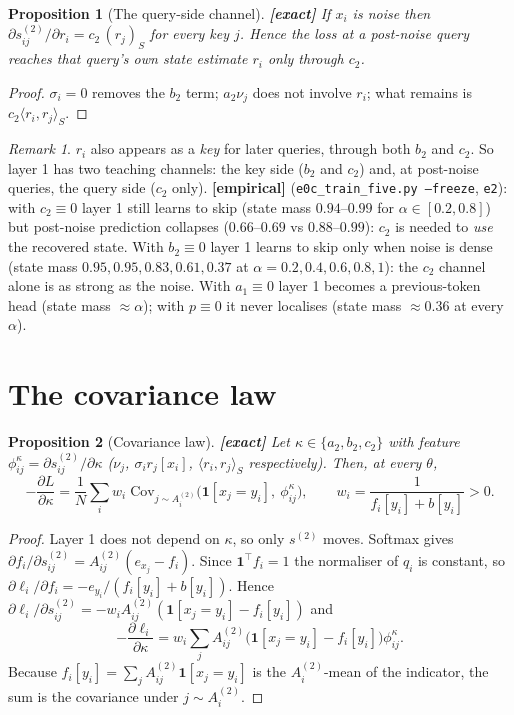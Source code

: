 \documentclass[11pt]{article}
\newtheorem{proposition}{Proposition}
\theoremstyle{definition}
\theoremstyle{remark}
\newtheorem{remark}{Remark}
\newcommand{\1}{\mathbf{1}}
\newcommand{\ip}[2]{\langle #1,#2\rangle_{S}}
\begin{document}
\begin{proposition}[The query-side channel] \textbf{[exact]}
If $x_i$ is noise then $\partial s^{(2)}_{ij}/\partial r_i = c_2\,(r_j)_S$ for every key $j$.
Hence the loss at a post-noise query reaches that query's \emph{own} state estimate $r_i$
only through $c_2$.
\end{proposition}
\begin{proof}
$\sigma_i=0$ removes the $b_2$ term; $a_2\nu_j$ does not involve $r_i$; what remains is
$c_2\ip{r_i}{r_j}$.
\end{proof}
\begin{remark}
$r_i$ also appears as a \emph{key} for later queries, through both $b_2$ and $c_2$. So layer 1
has two teaching channels: the key side ($b_2$ and $c_2$) and, at post-noise queries, the query
side ($c_2$ only). \textbf{[empirical]} (\texttt{e0c\_train\_five.py --freeze}, \texttt{e2}):
with $c_2\equiv0$ layer 1 still learns to skip (state mass $0.94$--$0.99$ for
$\alpha\in[0.2,0.8]$) but post-noise prediction collapses ($0.66$--$0.69$ vs $0.88$--$0.99$):
$c_2$ is needed to \emph{use} the recovered state. With $b_2\equiv0$ layer 1 learns to skip only
when noise is dense (state mass $0.95, 0.95, 0.83, 0.61, 0.37$ at $\alpha=0.2,0.4,0.6,0.8,1$):
the $c_2$ channel alone is as strong as the noise. With $a_1\equiv0$ layer 1 becomes a
previous-token head (state mass $\approx\alpha$); with $p\equiv0$ it never localises
(state mass $\approx0.36$ at every $\alpha$).
\end{remark}

\section{The covariance law}

\begin{proposition}[Covariance law] \textbf{[exact]}
Let $\kappa\in\{a_2,b_2,c_2\}$ with feature $\phi^\kappa_{ij}=\partial s^{(2)}_{ij}/\partial\kappa$
($\nu_j$, $\sigma_i r_j[x_i]$, $\ip{r_i}{r_j}$ respectively). Then, at every $\theta$,
\[
-\frac{\partial L}{\partial \kappa}
= \frac1N\sum_i w_i\;\mathrm{Cov}_{j\sim A^{(2)}_i}\!\big(\1[x_j=y_i],\ \phi^\kappa_{ij}\big),
\qquad w_i=\frac{1}{f_i[y_i]+b[y_i]}>0 .
\]
\end{proposition}
\begin{proof}
Layer 1 does not depend on $\kappa$, so only $s^{(2)}$ moves. Softmax gives
$\partial f_i/\partial s^{(2)}_{ij}=A^{(2)}_{ij}(e_{x_j}-f_i)$. Since $\1^\top f_i=1$ the
normaliser of $q_i$ is constant, so $\partial\ell_i/\partial f_i=-e_{y_i}/(f_i[y_i]+b[y_i])$.
Hence $\partial\ell_i/\partial s^{(2)}_{ij}=-w_iA^{(2)}_{ij}(\1[x_j=y_i]-f_i[y_i])$ and
\[
-\frac{\partial\ell_i}{\partial\kappa}=w_i\sum_jA^{(2)}_{ij}\big(\1[x_j=y_i]-f_i[y_i]\big)\phi^\kappa_{ij}.
\]
Because $f_i[y_i]=\sum_jA^{(2)}_{ij}\1[x_j=y_i]$ is the $A^{(2)}_i$-mean of the indicator, the sum
is the covariance under $j\sim A^{(2)}_i$.
\end{proof}
\end{document}
